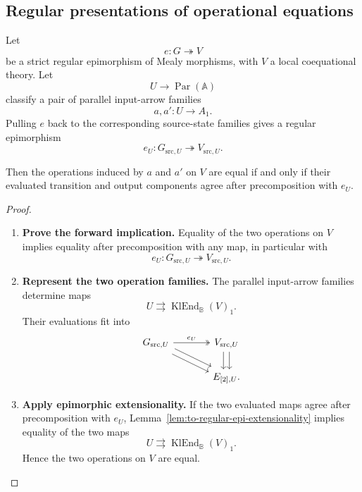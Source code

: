 \subsection{Regular presentations of operational equations}
\label{subsec:to-regular-presentations}

\begin{theorem}
\label{thm:to-regular-presentation-detection}
    Let
    \[
        e:G\twoheadrightarrow V
    \]
    be a strict regular epimorphism of Mealy morphisms, with \(V\) a local
    coequational theory. Let
    \[
        U\to
        \operatorname{Par}(\mathbb A)
    \]
    classify a pair of parallel input-arrow families
    \[
        a,a':U\to A_1.
    \]
    Pulling \(e\) back to the corresponding source-state families gives a
    regular epimorphism
    \[
        e_U:
        G_{\mathrm{src},U}
        \twoheadrightarrow
        V_{\mathrm{src},U}.
    \]

    Then the operations induced by \(a\) and \(a'\) on \(V\) are equal if and
    only if their evaluated transition and output components agree after
    precomposition with \(e_U\).
\end{theorem}

\begin{proof}
    \leavevmode
    \begin{enumerate}
        \item \textbf{Prove the forward implication.}
        Equality of the two operations on \(V\) implies equality after
        precomposition with any map, in particular with
        \[
            e_U:
            G_{\mathrm{src},U}
            \twoheadrightarrow
            V_{\mathrm{src},U}.
        \]

        \item \textbf{Represent the two operation families.}
        The parallel input-arrow families determine maps
        \[
            U\rightrightarrows
            \operatorname{KlEnd}_{\mathbb B}(V)_1.
        \]
        Their evaluations fit into
        \[
        \begin{tikzcd}[column sep=large]
            G_{\mathrm{src},U}
                \arrow[r, two heads, "e_U"]
                \arrow[dr, shift left=.7ex]
                \arrow[dr, shift right=.7ex]
            &
            V_{\mathrm{src},U}
                \arrow[d, shift left=.7ex]
                \arrow[d, shift right=.7ex]
            \\
            &
            E_{[2],U}.
        \end{tikzcd}
        \]

        \item \textbf{Apply epimorphic extensionality.}
        If the two evaluated maps agree after precomposition with \(e_U\),
        Lemma~\ref{lem:to-regular-epi-extensionality} implies equality of the
        two maps
        \[
            U\rightrightarrows
            \operatorname{KlEnd}_{\mathbb B}(V)_1.
        \]
        Hence the two operations on \(V\) are equal.
    \end{enumerate}
\end{proof}


